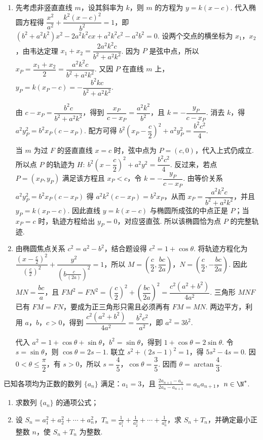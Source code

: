 \begin{solution}
\begin{enumerate}
\item 先考虑非竖直直线 \(m\)，设其斜率为 \(k\)，则 \(m\) 的方程为 \(y=k(x-c)\). 代入椭圆方程得
\(\dfrac{x^2}{a^2}+\dfrac{k^2(x-c)^2}{b^2}=1\)，即
\((b^2+a^2k^2)x^2-2a^2k^2cx+a^2k^2c^2-a^2b^2=0\).
设两个交点的横坐标为 \(x_1\)，\(x_2\)，由韦达定理
\(x_1+x_2=\dfrac{2a^2k^2c}{b^2+a^2k^2}\). 因为 \(P\) 是弦中点，所以
\(x_P=\dfrac{x_1+x_2}{2}=\dfrac{a^2k^2c}{b^2+a^2k^2}\).
又因 \(P\) 在直线 \(m\) 上，
\(y_P=k(x_P-c)=-\dfrac{b^2kc}{b^2+a^2k^2}\).

由 \(c-x_P=\dfrac{b^2c}{b^2+a^2k^2}\)，得到
\(\dfrac{x_P}{c-x_P}=\dfrac{a^2k^2}{b^2}\)，且 \(k=-\dfrac{y_P}{c-x_P}\). 消去 \(k\)，得
\(a^2y_P^2=b^2x_P(c-x_P)\). 配方可得
\(b^2\left(x_P-\dfrac c2\right)^2+a^2y_P^2=\dfrac{b^2c^2}{4}\).

当 \(m\) 为过 \(F\) 的竖直直线 \(x=c\) 时，弦中点为 \(P=(c,0)\)，代入上式仍成立. 所以点 \(P\) 的轨迹为
\(H:\ b^2\left(x-\dfrac c2\right)^2+a^2y^2=\dfrac{b^2c^2}{4}\).
反过来，若点 \(P=(x_P,y_P)\) 满足该方程且 \(x_P<c\)，令
\(k=-\dfrac{y_P}{c-x_P}\). 由等价关系
\(a^2y_P^2=b^2x_P(c-x_P)\) 得
\(a^2k^2(c-x_P)=b^2x_P\)，从而
\(x_P=\dfrac{a^2k^2c}{b^2+a^2k^2}\)，并且
\(y_P=k(x_P-c)\). 因此直线 \(y=k(x-c)\) 与椭圆所成弦的中点正是 \(P\)；当 \(x_P=c\) 时，轨迹方程给出 \(y_P=0\)，对应竖直弦. 所以该椭圆恰为点 \(P\) 的完整轨迹.
\item 由椭圆焦点关系 \(c^2=a^2-b^2\)，结合题设得 \(c^2=1+\cos\theta\). 将轨迹方程化为
\(\dfrac{\left(x-\frac c2\right)^2}{(\frac{c}{2})^2}+\dfrac{y^2}{(b\frac{c}{(2a)})^2}=1\)，所以
\(M=\left(\dfrac c2,\dfrac{bc}{2a}\right)\)，\(N=\left(\dfrac c2,-\dfrac{bc}{2a}\right)\).
因此 \(MN=\dfrac{bc}{a}\)，且
\(FM^2=FN^2=\left(\dfrac c2\right)^2+\left(\dfrac{bc}{2a}\right)^2=\dfrac{c^2(a^2+b^2)}{4a^2}\).
三角形 \(MNF\) 已有 \(FM=FN\)，要成为正三角形只需且必须再有 \(FM=MN\). 两边平方，利用 \(a\)，\(b\)，\(c>0\)，得到
\(\dfrac{c^2(a^2+b^2)}{4a^2}=\dfrac{b^2c^2}{a^2}\)，即 \(a^2=3b^2\).

代入 \(a^2=1+\cos\theta+\sin\theta\)，\(b^2=\sin\theta\)，得到
\(1+\cos\theta=2\sin\theta\). 令 \(s=\sin\theta\)，则 \(\cos\theta=2s-1\). 联立
\(s^2+(2s-1)^2=1\)，得 \(5s^2-4s=0\). 因 \(0<\theta\leqslant\dfrac\pi2\)，有 \(s>0\)，所以 \(s=\dfrac45\)，\(\cos\theta=\dfrac35\). 因而
\(\theta=\arctan\dfrac43\).
\end{enumerate}
\end{solution}

\begin{problem}
已知各项均为正数的数列 \(\{a_{n}\}\) 满足：\(a_{1} = 3\)，且 \(\frac{2a_{n+1} - a_{n}}{2a_{n} - a_{n+1}} = a_{n}a_{n+1}\)，\(n \in \N^{*}\).
\begin{enumerate}
\item 求数列 \( \{a_{n}\} \) 的通项公式；
\item 设 \(S_{n} = a_{1}^{2} + a_{2}^{2} + \cdots + a_{n}^{2}\)，\(T_{n} = \frac{1}{a_{1}^{2}} + \frac{1}{a_{2}^{2}} + \cdots + \frac{1}{a_{n}^{2}}\)，求 \(S_{n} + T_{n}\)，并确定最小正整数 \(n\)，使 \(S_{n} + T_{n}\) 为整数.
\end{enumerate}
\end{problem}

